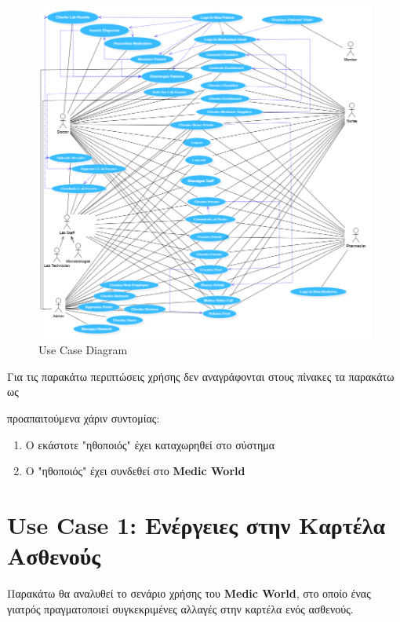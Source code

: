 \documentclass{article}
\begin{document}
\newpage

\begin{figure}[!htb]
        \centering
        \includegraphics[width=1.1\textwidth]{UML.png}
        \caption{\label{fig: UML} Use Case Diagram}
\end{figure}
        
\vspace{0.5cm}

Για τις παρακάτω περιπτώσεις χρήσης δεν αναγράφονται στους πίνακες τα παρακάτω ως \par προαπαιτούμενα χάριν συντομίας:

\begin{enumerate}
    \item  Ο εκάστοτε "ηθοποιός" έχει καταχωρηθεί στο σύστημα
    \item Ο "ηθοποιός" έχει συνδεθεί στο \textbf{Medic World}
\end{enumerate}

\newpage

\section{Use Case 1: Ενέργειες στην Καρτέλα Ασθενούς}

Παρακάτω θα αναλυθεί το σενάριο χρήσης του \textbf{Medic World}, στο οποίο ένας γιατρός πραγματοποιεί συγκεκριμένες αλλαγές στην καρτέλα ενός ασθενούς.
\end{document}

